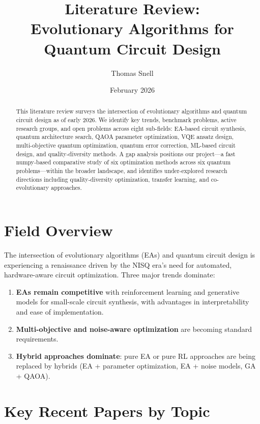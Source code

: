 \documentclass[11pt]{article}
\title{Literature Review:\\Evolutionary Algorithms for Quantum Circuit Design}
\author{Thomas Snell}
\date{February 2026}
\begin{document}
\maketitle

\begin{abstract}
This literature review surveys the intersection of evolutionary algorithms and quantum circuit design as of early 2026.
We identify key trends, benchmark problems, active research groups, and open problems across eight sub-fields: EA-based circuit synthesis, quantum architecture search, QAOA parameter optimization, VQE ansatz design, multi-objective quantum optimization, quantum error correction, ML-based circuit design, and quality-diversity methods.
A gap analysis positions our project---a fast numpy-based comparative study of six optimization methods across six quantum problems---within the broader landscape, and identifies under-explored research directions including quality-diversity optimization, transfer learning, and co-evolutionary approaches.
\end{abstract}

\tableofcontents
\newpage

\section{Field Overview}
\label{sec:overview}

The intersection of evolutionary algorithms (EAs) and quantum circuit design is experiencing a renaissance driven by the NISQ era's need for automated, hardware-aware circuit optimization. Three major trends dominate:

\begin{enumerate}
    \item \textbf{EAs remain competitive} with reinforcement learning and generative models for small-scale circuit synthesis, with advantages in interpretability and ease of implementation.
    \item \textbf{Multi-objective and noise-aware optimization} are becoming standard requirements.
    \item \textbf{Hybrid approaches dominate}: pure EA or pure RL approaches are being replaced by hybrids (EA + parameter optimization, EA + noise models, GA + QAOA).
\end{enumerate}

\section{Key Recent Papers by Topic}
\label{sec:papers}
\end{document}
